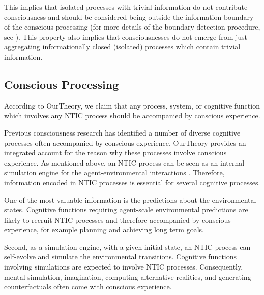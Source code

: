 \documentclass[utf8]{article}
\begin{document}
                This implies that isolated processes with trivial information do not contribute consciousness and should be considered being outside the information boundary of the conscious processing (for more details of the boundary detection procedure, see \cite{krakauer2014information}). 
                This property also implies that consciousnesses do not emerge from just aggregating informationally closed (isolated) processes which contain trivial information.%
                
                
                



		\subsection{Conscious Processing}\label{sec:conscious processing}
		    According to \ac{OurTheory}, we claim that any process, system, or cognitive function which involves any NTIC process should be accompanied by conscious experience. 
		    
		    Previous consciousness research has identified a number of diverse cognitive processes often accompanied by conscious experience. \ac{OurTheory} provides an integrated account for the reason why these processes involve conscious experience. As mentioned above, an NTIC process can be seen as an internal simulation engine for the agent-environmental interactions \citep{BERTSCHINGER.2006}. Therefore, information encoded in NTIC processes is essential for several cognitive processes. 
		    
		    One of the most valuable information is the predictions about the environmental states. Cognitive functions requiring agent-scale environmental predictions are likely to recruit NTIC processes and therefore accompanied by conscious experience, for example planning and achieving long term goals.
		   
            Second, as a simulation engine, with a given initial state, an NTIC process can self-evolve and simulate the environmental transitions. Cognitive functions involving simulations are expected to involve NTIC processes. Consequently, mental simulation, imagination, computing alternative realities, and generating counterfactuals often come with conscious experience. 
            
\end{document}
